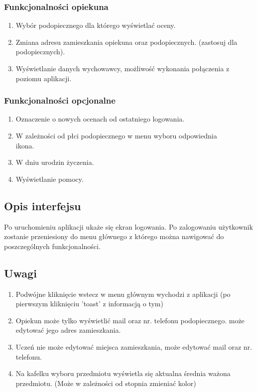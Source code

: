 \documentclass[12pt, titlepage]{article}
\begin{document}
\subsubsection{Funkcjonalności opiekuna}

\begin{enumerate}
\item Wybór podopiecznego dla którego wyświetlać oceny.
\item Zmiana adresu zamieszkania opiekuna oraz podopiecznych. (zastosuj dla podopiecznych).
\item Wyświetlanie danych wychowawcy, możliwość wykonania połączenia z poziomu aplikacji.
\end{enumerate}


\subsubsection{Funkcjonalności opcjonalne}

\begin{enumerate}
\item Oznaczenie o nowych ocenach od ostatniego logowania.
\item W zależności od płci podopiecznego w menu wyboru odpowiednia \\ ikona.
\item W dniu urodzin życzenia.
\item Wyświetlanie pomocy.
\end{enumerate}


\subsection{Opis interfejsu}

Po uruchomieniu aplikacji ukaże się ekran logowania. Po zalogowaniu użytkownik zostanie przeniesiony do menu głównego z którego można nawigować do poszczególnych funkcjonalności.

\subsection{Uwagi}

\begin{enumerate}
\item Podwójne kliknięcie wstecz w menu głównym wychodzi z aplikacji (po pierwszym kliknięciu 'toast' z informacją o tym)

\item Opiekun może tylko wyświetlić mail oraz nr. telefonu podopiecznego. może edytować jego adres zamieszkania.

\item Uczeń nie może edytować miejsca zamieszkania, może edytować mail oraz nr. telefonu.

\item Na kafelku wyboru przedmiotu wyświetla się aktualna średnia ważona przedmiotu. (Może w zależności od stopnia zmieniać kolor)
\end{enumerate}
\end{document}
